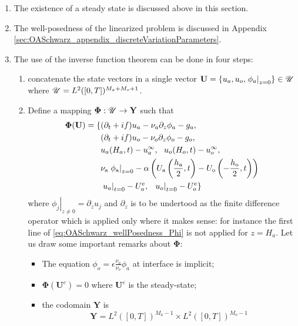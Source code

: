 \begin{enumerate}
	\item The existence of a steady state is discussed above
		in this section.
	\item The well-posedness of the linearized
		problem is discussed in Appendix
	\ref{sec:OASchwarz_appendix_discreteVariationParameters}.
	\item The use of the inverse function theorem can be
		done in four steps:
	\begin{enumerate}
		\item concatenate the state vectors
			in a single vector $\mathbf{U}=
			\{u_a, u_o, \left.\phi_a\right|_{z=0}\}
			\in \mathbf{\cal U}$
		where $\mathbf{\cal U} = L^2([0,T])^{M_a+M_o+1}$.
		\item
	Define a mapping
	$\mathbf{\Phi}: \mathbf{\cal U}\rightarrow \mathbf{Y}$
	such that
\begin{equation}
	\label{eq:OASchwarz_wellPosedness_Phi}
\begin{aligned}
	\mathbf{\Phi}(\mathbf{U}) =
	\{&(\partial_t + if) u_a - \nu_a\partial_z \phi_a - g_a, \\
	&(\partial_t + if) u_o - \nu_o\partial_z \phi_o - g_o, \\
	&u_a(H_a, t) - u^\infty_a, ~~ u_o(H_o, t) - u^\infty_o, \\
	&\nu_{\rm a}\left.\phi_{\rm a}\right|_{z=0} - \alpha
	\left( U_{\rm a}\left(\frac{h_{\rm a}}{2},
	t\right) - U_{\rm o}\left(-\frac{h_{\rm o}}{2},
	t\right)\right) \\
	&\left.u_a\right|_{t=0} - U^e_{a}, ~~
	\left.u_o\right|_{t=0} - U^e_{o}\}
\end{aligned}
\end{equation}
where $\left.\phi_j\right|_{z\neq 0} = \partial_z u_j$
and $\partial_z$ is to be undertood as the finite difference
operator which is applied only where it makes sense:
for instance the first line of \eqref{eq:OASchwarz_wellPosedness_Phi}
is not applied for $z=H_a$.
Let us draw some important remarks about $\mathbf{\Phi}$:
\begin{itemize}
 \item The equation $\phi_o = \epsilon \frac{\nu_a}{\nu_o}\phi_a$
	 at interface is implicit;
 \item $\mathbf{\Phi}(\mathbf{U}^e)=0$
 	where $\mathbf{U}^e$
 	is the steady-state;
 \item the codomain $\mathbf{Y}$ is
 	\begin{equation}
		\mathbf{Y}=L^2([0,T])^{M_a-1}
			\times L^2([0,T])^{M_o-1}

\end{equation}
\end{itemize}
\end{enumerate}
\end{enumerate}
